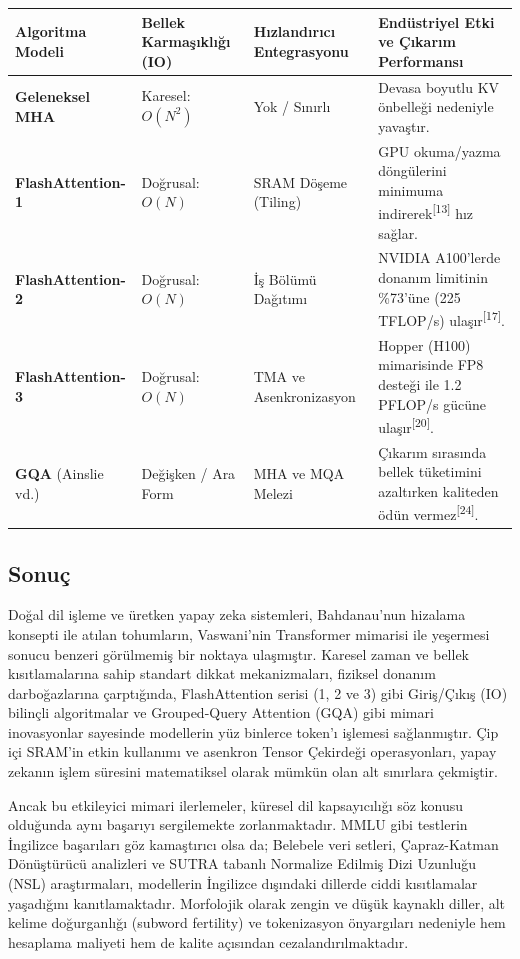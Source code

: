\documentclass[11pt,a4paper]{article}
\begin{document}
\begin{longtable}{>{\raggedright\arraybackslash}p{}>{\raggedright\arraybackslash}p{}>{\raggedright\arraybackslash}p{}>{\raggedright\arraybackslash}p{}}
\toprule
\textbf{Algoritma Modeli} & \textbf{Bellek Karmaşıklığı (IO)} & \textbf{Hızlandırıcı Entegrasyonu} & \textbf{Endüstriyel Etki ve Çıkarım Performansı} \\
\midrule
\endhead
\textbf{Geleneksel MHA} & Karesel: \(O(N^2)\) & Yok / Sınırlı & Devasa boyutlu KV önbelleği nedeniyle yavaştır. \\
\textbf{FlashAttention-1} & Doğrusal: \(O(N)\) & SRAM Döşeme (Tiling) & GPU okuma/yazma döngülerini minimuma indirerek\textsuperscript{[13]} hız sağlar. \\
\textbf{FlashAttention-2} & Doğrusal: \(O(N)\) & İş Bölümü Dağıtımı & NVIDIA A100'lerde donanım limitinin \%73'üne (225 TFLOP/s) ulaşır\textsuperscript{[17]}. \\
\textbf{FlashAttention-3} & Doğrusal: \(O(N)\) & TMA ve Asenkronizasyon & Hopper (H100) mimarisinde FP8 desteği ile 1.2 PFLOP/s gücüne ulaşır\textsuperscript{[20]}. \\
\textbf{GQA} (Ainslie vd.) & Değişken / Ara Form & MHA ve MQA Melezi & Çıkarım sırasında bellek tüketimini azaltırken kaliteden ödün vermez\textsuperscript{[24]}. \\
\bottomrule
\end{longtable}
\subsection{Sonuç}
Doğal dil işleme ve üretken yapay zeka sistemleri, Bahdanau'nun hizalama konsepti ile atılan tohumların, Vaswani'nin Transformer mimarisi ile yeşermesi sonucu benzeri görülmemiş bir noktaya ulaşmıştır. Karesel zaman ve bellek kısıtlamalarına sahip standart dikkat mekanizmaları, fiziksel donanım darboğazlarına çarptığında, FlashAttention serisi (1, 2 ve 3) gibi Giriş/Çıkış (IO) bilinçli algoritmalar ve Grouped-Query Attention (GQA) gibi mimari inovasyonlar sayesinde modellerin yüz binlerce token'ı işlemesi sağlanmıştır. Çip içi SRAM'in etkin kullanımı ve asenkron Tensor Çekirdeği operasyonları, yapay zekanın işlem süresini matematiksel olarak mümkün olan alt sınırlara çekmiştir.

Ancak bu etkileyici mimari ilerlemeler, küresel dil kapsayıcılığı söz konusu olduğunda aynı başarıyı sergilemekte zorlanmaktadır. MMLU gibi testlerin İngilizce başarıları göz kamaştırıcı olsa da; Belebele veri setleri, Çapraz-Katman Dönüştürücü analizleri ve SUTRA tabanlı Normalize Edilmiş Dizi Uzunluğu (NSL) araştırmaları, modellerin İngilizce dışındaki dillerde ciddi kısıtlamalar yaşadığını kanıtlamaktadır. Morfolojik olarak zengin ve düşük kaynaklı diller, alt kelime doğurganlığı (subword fertility) ve tokenizasyon önyargıları nedeniyle hem hesaplama maliyeti hem de kalite açısından cezalandırılmaktadır.
\end{document}

